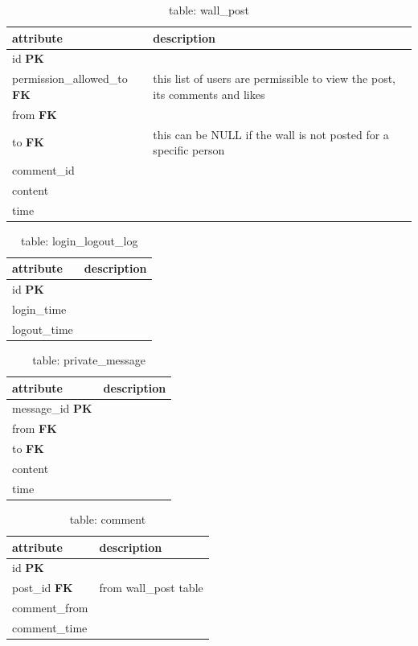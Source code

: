 \begin{table}[h]
    \centering
    \begin{tabular}{ll}
    attribute                           & description\\ \hline
    id \textbf{PK}                      & \\
    permission\_allowed\_to \textbf{FK} & this list of users are permissible to view the post, its comments and likes\\
    from \textbf{FK}                    & \\
    to \textbf{FK}                      & this can be NULL if the wall is not posted for a specific person\\
    comment\_id                         & \\
    content                             & \\
    time                                & \\
    \end{tabular}
    \caption{table: wall\_post}
\end{table}

\begin{table}[h]
    \centering
    \begin{tabular}{ll}
    attribute      & description\\ \hline
    id \textbf{PK} & \\
    login\_time    & \\
    logout\_time   & \\
    \end{tabular}
    \caption{table: login\_logout\_log}
\end{table}

\begin{table}[h]
    \centering
    \begin{tabular}{ll}
    attribute               & description\\ \hline
    message\_id \textbf{PK} & \\
    from \textbf{FK}        & \\
    to \textbf{FK}          & \\
    content                 & \\
    time                    & \\
    \end{tabular}
    \caption{table: private\_message}
\end{table}

\begin{table}[h]
    \centering
    \begin{tabular}{ll}
    attribute            & description\\ \hline
    id \textbf{PK}       & \\
    post\_id \textbf{FK} & from wall\_post table\\
    comment\_from        & \\
    comment\_time        & \\
    \end{tabular}
    \caption{table: comment}
\end{table}

